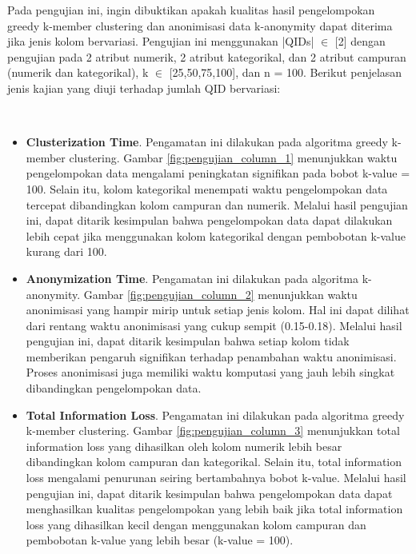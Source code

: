 \vspace{0.5cm}

\begin{minipage}[t]{15.8cm}
Pada pengujian ini, ingin dibuktikan apakah kualitas hasil pengelompokan   greedy k-member clustering dan anonimisasi data k-anonymity dapat diterima jika jenis kolom bervariasi. Pengujian ini menggunakan |QIDs| $\in$ [2] dengan pengujian pada 2 atribut numerik, 2 atribut kategorikal, dan 2 atribut campuran (numerik dan kategorikal), k $\in$ [25,50,75,100], dan n = 100. Berikut penjelasan jenis kajian yang diuji terhadap jumlah QID bervariasi:
\end{minipage}\\

\begin{itemize}

\item \textbf{Clusterization Time}. Pengamatan ini dilakukan pada algoritma greedy k-member clustering. Gambar \ref{fig:pengujian_column_1} menunjukkan waktu pengelompokan data mengalami peningkatan signifikan pada bobot k-value = 100. Selain itu, kolom kategorikal menempati waktu pengelompokan data tercepat dibandingkan kolom campuran dan numerik. Melalui hasil pengujian ini, dapat ditarik kesimpulan bahwa pengelompokan data dapat dilakukan lebih cepat jika menggunakan kolom kategorikal dengan pembobotan k-value kurang dari 100.

\item \textbf{Anonymization Time}. Pengamatan ini dilakukan pada algoritma k-anonymity. Gambar \ref{fig:pengujian_column_2} menunjukkan waktu anonimisasi yang hampir mirip untuk setiap jenis kolom. Hal ini dapat dilihat dari rentang waktu anonimisasi yang cukup sempit (0.15-0.18). Melalui hasil pengujian ini, dapat ditarik kesimpulan bahwa setiap kolom tidak memberikan pengaruh signifikan terhadap penambahan waktu anonimisasi. Proses anonimisasi juga memiliki waktu komputasi yang jauh lebih singkat dibandingkan pengelompokan data.

\newpage
\item \textbf{Total Information Loss}. Pengamatan ini dilakukan pada algoritma greedy k-member clustering. Gambar \ref{fig:pengujian_column_3} menunjukkan total information loss yang dihasilkan oleh kolom numerik lebih besar dibandingkan kolom campuran dan kategorikal. Selain itu, total information loss mengalami penurunan seiring bertambahnya bobot k-value. Melalui hasil pengujian ini, dapat ditarik kesimpulan bahwa pengelompokan data dapat menghasilkan kualitas pengelompokan yang lebih baik jika total information loss yang dihasilkan kecil dengan menggunakan kolom campuran dan pembobotan k-value yang lebih besar (k-value = 100).

\end{itemize}


